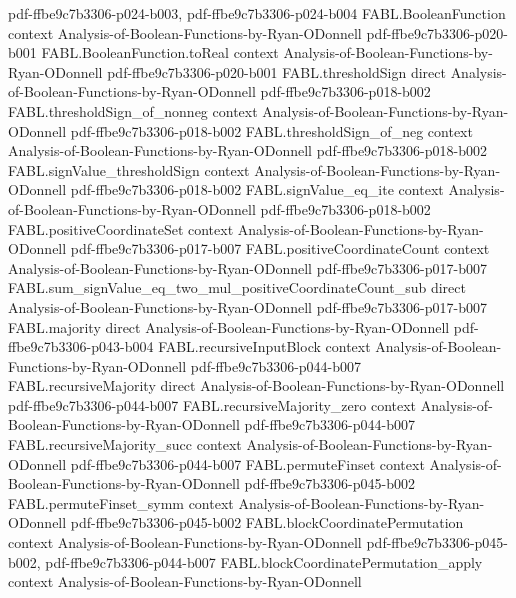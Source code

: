\begin{theorem}
  {pdf-ffbe9c7b3306-p024-b003,
    pdf-ffbe9c7b3306-p024-b004}
\proofstep
  {FABL.BooleanFunction}
  {context}
  {Analysis-of-Boolean-Functions-by-Ryan-ODonnell}
  {pdf-ffbe9c7b3306-p020-b001}
\proofstep
  {FABL.BooleanFunction.toReal}
  {context}
  {Analysis-of-Boolean-Functions-by-Ryan-ODonnell}
  {pdf-ffbe9c7b3306-p020-b001}
\proofstep
  {FABL.thresholdSign}
  {direct}
  {Analysis-of-Boolean-Functions-by-Ryan-ODonnell}
  {pdf-ffbe9c7b3306-p018-b002}
\proofstep
  {FABL.thresholdSign_of_nonneg}
  {context}
  {Analysis-of-Boolean-Functions-by-Ryan-ODonnell}
  {pdf-ffbe9c7b3306-p018-b002}
\proofstep
  {FABL.thresholdSign_of_neg}
  {context}
  {Analysis-of-Boolean-Functions-by-Ryan-ODonnell}
  {pdf-ffbe9c7b3306-p018-b002}
\proofstep
  {FABL.signValue_thresholdSign}
  {context}
  {Analysis-of-Boolean-Functions-by-Ryan-ODonnell}
  {pdf-ffbe9c7b3306-p018-b002}
\proofstep
  {FABL.signValue_eq_ite}
  {context}
  {Analysis-of-Boolean-Functions-by-Ryan-ODonnell}
  {pdf-ffbe9c7b3306-p018-b002}
\proofstep
  {FABL.positiveCoordinateSet}
  {context}
  {Analysis-of-Boolean-Functions-by-Ryan-ODonnell}
  {pdf-ffbe9c7b3306-p017-b007}
\proofstep
  {FABL.positiveCoordinateCount}
  {context}
  {Analysis-of-Boolean-Functions-by-Ryan-ODonnell}
  {pdf-ffbe9c7b3306-p017-b007}
\proofstep
  {FABL.sum_signValue_eq_two_mul_positiveCoordinateCount_sub}
  {direct}
  {Analysis-of-Boolean-Functions-by-Ryan-ODonnell}
  {pdf-ffbe9c7b3306-p017-b007}
\proofstep
  {FABL.majority}
  {direct}
  {Analysis-of-Boolean-Functions-by-Ryan-ODonnell}
  {pdf-ffbe9c7b3306-p043-b004}
\proofstep
  {FABL.recursiveInputBlock}
  {context}
  {Analysis-of-Boolean-Functions-by-Ryan-ODonnell}
  {pdf-ffbe9c7b3306-p044-b007}
\proofstep
  {FABL.recursiveMajority}
  {direct}
  {Analysis-of-Boolean-Functions-by-Ryan-ODonnell}
  {pdf-ffbe9c7b3306-p044-b007}
\proofstep
  {FABL.recursiveMajority_zero}
  {context}
  {Analysis-of-Boolean-Functions-by-Ryan-ODonnell}
  {pdf-ffbe9c7b3306-p044-b007}
\proofstep
  {FABL.recursiveMajority_succ}
  {context}
  {Analysis-of-Boolean-Functions-by-Ryan-ODonnell}
  {pdf-ffbe9c7b3306-p044-b007}
\proofstep
  {FABL.permuteFinset}
  {context}
  {Analysis-of-Boolean-Functions-by-Ryan-ODonnell}
  {pdf-ffbe9c7b3306-p045-b002}
\proofstep
  {FABL.permuteFinset_symm}
  {context}
  {Analysis-of-Boolean-Functions-by-Ryan-ODonnell}
  {pdf-ffbe9c7b3306-p045-b002}
\proofstep
  {FABL.blockCoordinatePermutation}
  {context}
  {Analysis-of-Boolean-Functions-by-Ryan-ODonnell}
  {pdf-ffbe9c7b3306-p045-b002,
    pdf-ffbe9c7b3306-p044-b007}
\proofstep
  {FABL.blockCoordinatePermutation_apply}
  {context}
  {Analysis-of-Boolean-Functions-by-Ryan-ODonnell}

\end{theorem}
